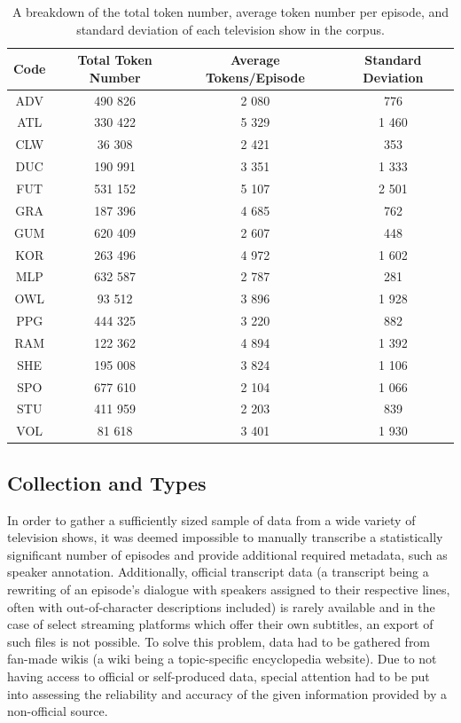 \documentclass[a4paper, 11pt]{article}
\begin{document}
\begin{table}[h!]
\centering
  \begin{small}
  \begin{tabular}{|| c | c | c | c ||}
  \hline
  Code & Total Token Number & Average Tokens/Episode & Standard Deviation \\
  \hline\hline
  ADV & 490 826 & 2 080 & 776 \\
  \hline
  ATL & 330 422 & 5 329 & 1 460 \\
  \hline
  CLW & 36 308 & 2 421 & 353 \\
  \hline
  DUC & 190 991 & 3 351 & 1 333 \\
  \hline
  FUT & 531 152 & 5 107 & 2 501 \\
  \hline
  GRA & 187 396 & 4 685 & 762 \\
  \hline
  GUM & 620 409 & 2 607 & 448 \\
  \hline
  KOR & 263 496 & 4 972 & 1 602 \\
  \hline
  MLP & 632 587 & 2 787 & 281 \\
  \hline
  OWL & 93 512 & 3 896 & 1 928 \\
  \hline
  PPG & 444 325 & 3 220 & 882 \\
  \hline
  RAM & 122 362 & 4 894 & 1 392 \\
  \hline
  SHE & 195 008 & 3 824 & 1 106 \\
  \hline
  SPO & 677 610 & 2 104 & 1 066 \\
  \hline
  STU & 411 959 & 2 203 & 839 \\
  \hline
  VOL & 81 618 & 3 401 & 1 930 \\
  \hline
  \end{tabular}
  \end{small}
  \caption{A breakdown of the total token number, average token number per episode, and standard deviation of each television show in the corpus.}
  \label{tab:corpus}
\end{table}

\subsection{Collection and Types} \label{dat:col}
In order to gather a sufficiently sized sample of data from a wide variety of television shows, it was deemed impossible to manually transcribe a statistically significant number of episodes and provide additional required metadata, such as speaker annotation. Additionally, official transcript data (a transcript being a rewriting of an episode's dialogue with speakers assigned to their respective lines, often with out-of-character descriptions included) is rarely available and in the case of select streaming platforms which offer their own subtitles, an export of such files is not possible. To solve this problem, data had to be gathered from fan-made wikis (a wiki being a topic-specific encyclopedia website). Due to not having access to official or self-produced data, special attention had to be put into assessing the reliability and accuracy of the given information provided by a non-official source.
\end{document}
